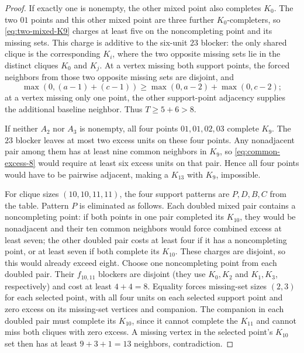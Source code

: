 \begin{proof}
If exactly one is nonempty, the other mixed point also completes $K_0$. The two $01$ points and this other mixed point are three further $K_0$-completers, so \eqref{eq:two-mixed-K9} charges at least five on the noncompleting point and its missing sets. This charge is additive to the six-unit $23$ blocker: the only shared clique is the corresponding $K_i$, where the two opposite missing sets lie in the distinct cliques $K_0$ and $K_j$. At a vertex missing both support points, the forced neighbors from those two opposite missing sets are disjoint, and
\[
\max(0,(a-1)+(c-1))\geq\max(0,a-2)+\max(0,c-2);
\]
at a vertex missing only one point, the other support-point adjacency supplies the additional baseline neighbor. Thus $T\geq5+6>8$.

If neither $A_2$ nor $A_3$ is nonempty, all four points $01,01,02,03$ complete $K_9$. The $23$ blocker leaves at most two excess units on these four points. Any nonadjacent pair among them has at least nine common neighbors in $K_9$, so \eqref{eq:common-excess-8} would require at least six excess units on that pair. Hence all four points would have to be pairwise adjacent, making a $K_{13}$ with $K_9$, impossible.

For clique sizes $(10,10,11,11)$, the four support patterns are $P,D,B,C$ from the table. Pattern $P$ is eliminated as follows. Each doubled mixed pair contains a noncompleting point: if both points in one pair completed its $K_{10}$, they would be nonadjacent and their ten common neighbors would force combined excess at least seven; the other doubled pair costs at least four if it has a noncompleting point, or at least seven if both complete its $K_{10}$. These charges are disjoint, so this would already exceed eight. Choose one noncompleting point from each doubled pair. Their $f_{10,11}$ blockers are disjoint (they use $K_0,K_2$ and $K_1,K_3$, respectively) and cost at least $4+4=8$. Equality forces missing-set sizes $(2,3)$ for each selected point, with all four units on each selected support point and zero excess on its missing-set vertices and companion. The companion in each doubled pair must complete its $K_{10}$, since it cannot complete the $K_{11}$ and cannot miss both cliques with zero excess. A missing vertex in the selected point's $K_{10}$ set then has at least $9+3+1=13$ neighbors, contradiction.


\end{proof}
